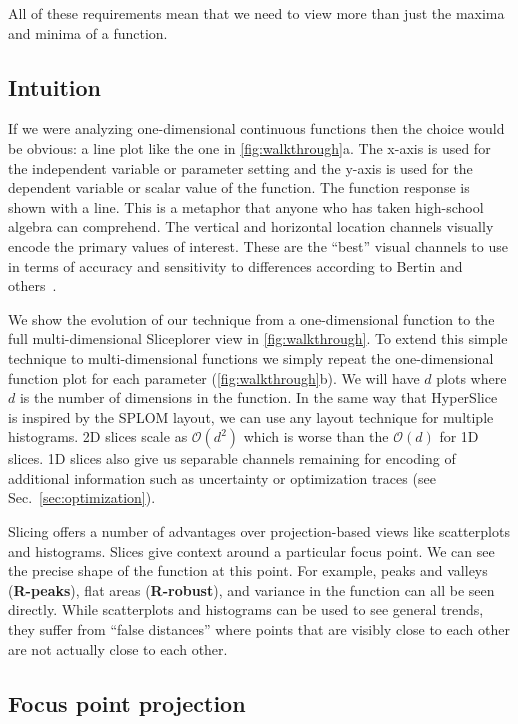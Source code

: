 All of
these requirements mean that we need to view more than just the maxima and
minima of a function.

\subsection{Intuition}

If we were analyzing one-dimensional continuous functions then the choice would
be obvious: a line plot like the one in \autoref{fig:walkthrough}a. The x-axis
is used for the independent variable or parameter setting and the y-axis is
used for the dependent variable or scalar value of the function. The function
response is shown with a line. This is a metaphor that anyone who has taken
high-school algebra can comprehend. The vertical and horizontal location
channels visually encode the primary values of interest. These are the ``best''
visual channels to use in terms of accuracy and sensitivity to differences
according to Bertin and others~\cite{Bertin:1967, Mackinlay:1986}. 

We show the evolution
of our technique from a one-dimensional function to the full multi-dimensional
Sliceplorer view in \autoref{fig:walkthrough}. 
To extend this simple technique to multi-dimensional functions we simply repeat
the one-dimensional function plot for each parameter
(\autoref{fig:walkthrough}b). 
We will have \(d\) plots where \(d\) is
the number of dimensions in the function. In the same way that
HyperSlice~\cite{Wijk:1993} is inspired by the SPLOM layout, we can use any
layout technique for multiple histograms. 2D slices scale as $\mathcal{O}(d^2)$
which is worse than the $\mathcal{O}(d)$ for 1D slices. 
1D slices also give us separable channels remaining for encoding of additional
information such as uncertainty or optimization traces (see
Sec.~\ref{sec:optimization}).

Slicing offers a number of advantages over projection-based views like
scatterplots and histograms. Slices give context around a particular focus
point. We can see the precise shape of the function at this point.  For
example, peaks and valleys (\textbf{R-peaks}), flat areas (\textbf{R-robust}),
and variance in the function can all be seen directly.  While scatterplots and
histograms can be used to see general trends, they suffer from ``false
distances'' where points that are visibly close to each other are not actually
close to each other. 

\subsection{Focus point projection}


